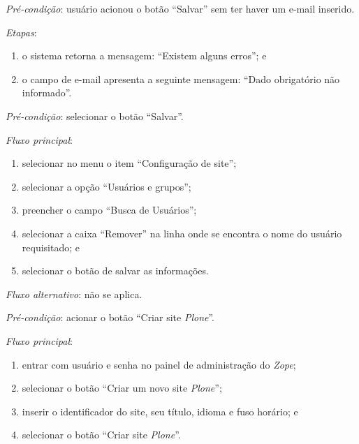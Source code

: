 \noindent \textit{Pré-condição}: usuário acionou o botão ``Salvar'' sem ter haver um e-mail inserido.

\noindent \textit{Etapas}:

\begin{enumerate}
    \item o sistema retorna a mensagem: ``Existem alguns erros''; e
    \item o campo de e-mail apresenta a seguinte mensagem: ``Dado obrigatório não informado''.
\end{enumerate}



\vspace{0.7cm}

\noindent \textit{Pré-condição}: selecionar o botão ``Salvar''.

\noindent \textit{Fluxo principal}:

\begin{enumerate}
    \item selecionar no menu o item ``Configuração de site'';
    \item selecionar a opção ``Usuários e grupos'';
    \item preencher o campo ``Busca de Usuários'';
    \item selecionar a caixa ``Remover'' na linha onde se encontra o nome do usuário requisitado; e
    \item selecionar o botão de salvar as informações.
\end{enumerate}

\noindent \textit{Fluxo alternativo}: não se aplica.



\vspace{0.7cm}

\noindent \textit{Pré-condição}: acionar o botão ``Criar site \textit{Plone}''.

\noindent \textit{Fluxo principal}:

\begin{enumerate}
    \item entrar com usuário e senha no painel de administração do \textit{Zope};
    \item selecionar o botão ``Criar um novo site \textit{Plone}'';
    \item inserir o identificador do site, seu título, idioma e fuso horário; e
    \item selecionar o botão ``Criar site \textit{Plone}''.
\end{enumerate}

